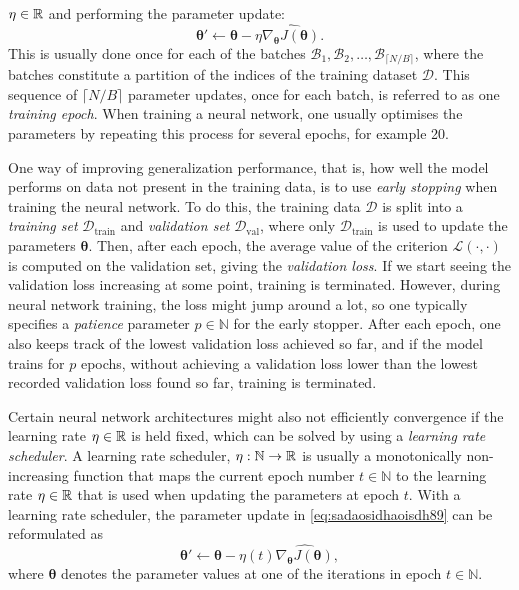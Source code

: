 \documentclass{statsmsc}
\begin{document}
{$\eta \in \mathbb{R}$ and performing the parameter update:
\begin{equation}\label{eq:sadaosidhaoisdh89}
    \bm\theta' \leftarrow \bm\theta - \eta \widehat{\nabla_{\bm\theta} J(\bm\theta)}.
\end{equation}
This is usually done once for each of the batches
$\mathcal{B}_1,\mathcal{B}_2,\dots, \mathcal{B}_{\lceil N / B \rceil}$, where
the batches constitute a partition of the indices of the training dataset
$\mathcal{D}$. This sequence of $\lceil N / B \rceil$ parameter updates, once for each batch, is
referred to as one \textit{training epoch}.
When training a neural network, one usually optimises the parameters by repeating this process
for several epochs, for example 20.


One way of improving generalization performance, that is, how well the model performs on data
not present in the training data, is to use \textit{early stopping} when training the neural
network. To do this, the training data $\mathcal{D}$ is split into a \textit{training set}
$\mathcal{D}_{\textrm{train}}$ and \textit{validation set} $\mathcal{D}_{\textrm{val}}$, where only
$\mathcal{D}_{\textrm{train}}$ is used to update the parameters $\bm\theta$.
Then, after each epoch, the average value of the criterion $\mathcal{L}(\cdot,\cdot)$ is computed on
the validation set, giving the \textit{validation loss}. If we start seeing the validation loss
increasing at some point, training is terminated. However, during neural network training, the loss
might jump around a lot, so one typically specifies a
\textit{patience} parameter $p\in\mathbb{N}$
for the early stopper. After each epoch, one also keeps track of the lowest validation loss achieved
so far, and if the model trains for $p$ epochs, without achieving a validation
loss lower than the lowest recorded validation loss found so far, training is terminated.

Certain neural network architectures might also not efficiently convergence if the learning
rate $\eta \in \mathbb{R}$ is held fixed, which can be solved by using a \textit{learning rate scheduler}.
A learning rate scheduler, $\eta: \mathbb{N} \rightarrow {\mathbb{R}}$ is usually a
monotonically non-increasing function that maps the current epoch number $t \in \mathbb{N}$
to the learning rate $\eta \in \mathbb{R}$ that is used when updating the parameters at epoch $t$. With
a learning rate scheduler, the parameter update in \cref{eq:sadaosidhaoisdh89} can be reformulated
as
\begin{equation}
    \bm\theta' \leftarrow \bm\theta - \eta(t) \widehat{\nabla_{\bm\theta} J\left(\bm\theta\right)},
\end{equation}
where $\bm\theta$ denotes the parameter values at one of the iterations in epoch $t \in \mathbb{N}$.

}
\end{document}
